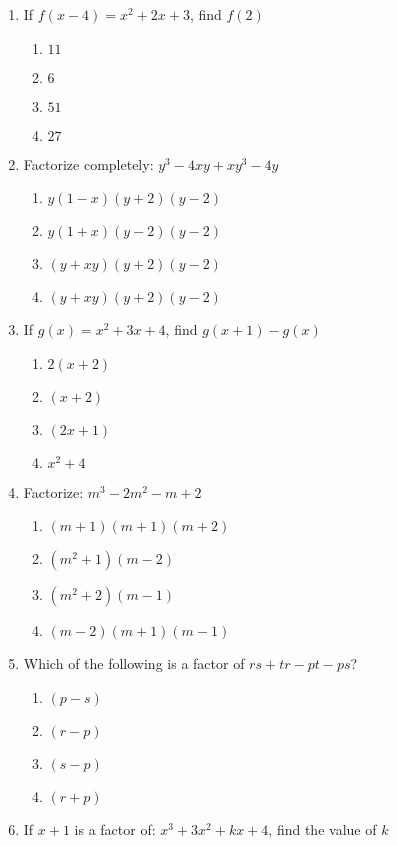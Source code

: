 \begin{multicols}{2}
\begin{enumerate}[label={\arabic*.}]
    \item If \(f(x-4) = {x}^{2}+2x+3\), find \(f(2)\)
      \begin{enumerate}[label={\Alph*.}]
        \item \(11\)
        \item \(6\)
        \item \(51\)
        \item \(27\)
      \end{enumerate}
    \item Factorize completely: \(y^3-4xy+xy^3-4y\)
      \begin{enumerate}[label={\Alph*.}]
        \item \(y(1-x)(y+2)(y-2)\)
        \item \(y(1+x)(y-2)(y-2)\)
        \item \((y+xy)(y+2)(y-2)\)
        \item \((y+xy)(y+2)(y-2)\)
      \end{enumerate}
    \item If \(g(x) = {x}^{2}+3x+4\), find \(g(x+1) - g(x)\)
      \begin{enumerate}[label={\Alph*.}]
        \item \(2(x+2)\)
        \item \((x+2)\)
        \item \((2x+1)\)
        \item \({x}^{2}+4\)
      \end{enumerate}
    \item Factorize: \(m^3-2m^2-m+2\)
      \begin{enumerate}[label={\Alph*.}]
        \item \((m+1)(m+1)(m+2)\)
        \item \((m^2+1)(m-2)\)
        \item \((m^2+2)(m-1)\)
        \item \((m-2)(m+1)(m-1)\)
      \end{enumerate}
    \item Which of the following is a factor of \(rs+tr-pt-ps\)?
      \begin{enumerate}[label={\Alph*.}]
        \item \((p-s)\)
        \item \((r-p)\)
        \item \((s-p)\)
        \item \((r+p)\)
      \end{enumerate}
    \item If \(x+1\) is a factor of: \({x}^{3}+3{x}^{2}+kx+4\), find the value of \(k\)

\end{enumerate}
\end{multicols}
